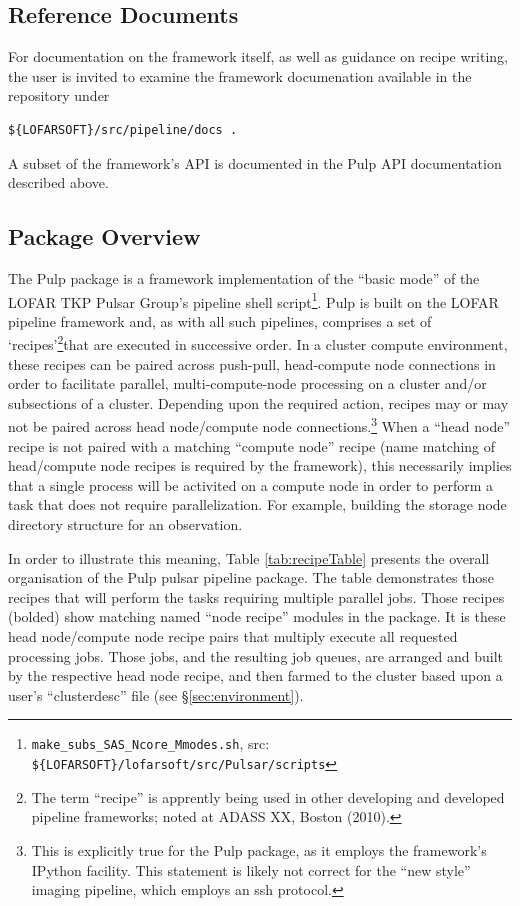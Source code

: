 \documentclass[a4paper,10pt,bibtotoc]{scrartcl}
\begin{document}
\subsection{Reference Documents}
\label{sec:refdocs}
For documentation on the framework itself, as well as guidance on recipe writing,
the user is invited to examine the framework documenation available in the 
repository under
\begin{verbatim}
${LOFARSOFT}/src/pipeline/docs .
\end{verbatim}
A subset of the framework's API is documented in the Pulp  API
documentation described above.

\subsection{Package Overview}
\label{sec:package}
The Pulp package is a framework implementation of the ``basic mode'' of the LOFAR TKP Pulsar Group's pipeline shell script\footnote{\texttt{make\_subs\_SAS\_Ncore\_Mmodes.sh}, src:
  \texttt{ \$\{LOFARSOFT\}/lofarsoft/src/Pulsar/scripts}}.  Pulp is
built on the LOFAR pipeline framework and, as with all such pipelines,
comprises a set of `recipes'\footnote{The term ``recipe'' is apprently
  being used in other developing and developed pipeline frameworks; noted
  at ADASS XX, Boston (2010).}that are executed in successive order.  
In a cluster compute environment, these recipes can be paired across
push-pull, head-compute node connections in order 
to facilitate parallel, multi-compute-node processing on a cluster and/or subsections of a 
cluster. Depending upon the required action, recipes may or may not be 
paired across head node/compute node connections.\footnote{This is
  explicitly true for the Pulp package, as it employs the framework's IPython
  facility.  This statement is likely not correct for the ``new
  style'' imaging pipeline, which employs an ssh protocol.}  When a ``head node'' 
recipe is not paired with a matching ``compute node'' recipe (name
matching of head/compute node recipes is required by the framework),
this necessarily implies that a single process will be activited on a
compute node in order to perform a task that does not require
parallelization. For example, building the storage node directory
structure for an observation.

In order to illustrate this meaning, Table \ref{tab:recipeTable} presents 
the overall organisation of the Pulp pulsar pipeline package.  The table 
demonstrates those recipes that will perform the tasks requiring multiple 
parallel jobs.  Those recipes (bolded) show matching named ``node recipe'' 
modules in the package.  It is these head node/compute node recipe pairs that 
multiply execute all requested processing jobs.  Those jobs, and the resulting 
job queues, are arranged and built by the respective head node recipe, and 
then farmed to the cluster based upon a user's ``clusterdesc'' 
file (see \S \ref{sec:environment}).
\end{document}
